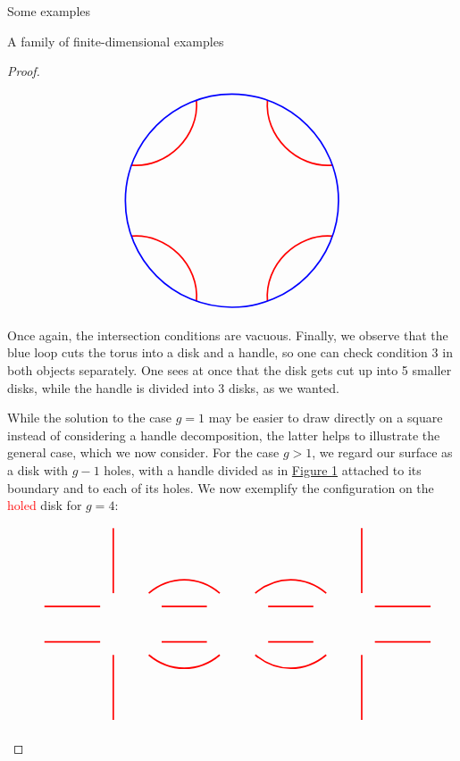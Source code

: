 \begin{chapter}{Some examples}
\begin{section}{A family of finite-dimensional examples}
\begin{proof}
\begin{figure}[h]
\label{divided-handle}
\[
\begin{tikzpicture}

\draw[red, very thick] (-2.83,1) to [bend right=50] (-1,2.83);
\draw[red, very thick] (2.83,1) to [bend left=50] (1,2.83);
\draw[red, very thick] (2.83,-1) to [bend right=50] (1,-2.83);
\draw[red, very thick] (-2.83,-1) to [bend left=50] (-1,-2.83);

\draw[blue, very thick] (0,0) circle (3cm);
\end{tikzpicture}
\]
\end{figure}

Once again, the intersection conditions are vacuous. Finally, we observe that the blue loop cuts the torus into a disk and a handle, so one can check condition $3$ in both objects separately. One sees at once that the disk gets cut up into 5 smaller disks, while the handle is divided into $3$ disks, as we wanted.

While the solution to the case $g=1$ may be easier to draw directly on a square instead of considering a handle decomposition, the latter helps to illustrate the general case, which we now consider. For the case $g>1$, we regard our surface as a disk with $g-1$ holes, with a handle divided as in \hyperref[divided-handle]{Figure \ref*{divided-handle}} attached to its boundary and to each of its holes. We now exemplify the configuration on the \textcolor{red}{holed} disk for $g=4$:

\begin{figure}[h]
\[
\begin{tikzpicture}
\draw[red, very thick] (-5.44, 0.5) -- (-3.87, 0.5);
\draw[red, very thick] (-5.44, -0.5) -- (-3.87, -0.5);
\draw[red, very thick] (5.44, 0.5) -- (3.87, 0.5);
\draw[red, very thick] (5.44, -0.5) -- (3.87, -0.5);

\draw[red, very thick] (-3.5,0.87) -- (-3.5,2.7);
\draw[red, very thick] (-3.5,-0.87) -- (-3.5,-2.7);
\draw[red, very thick] (3.5,0.87) -- (3.5,2.7);
\draw[red, very thick] (3.5,-0.87) -- (3.5,-2.7);

\draw[red, very thick] (-2.137, 0.5) -- (-0.863, 0.5);
\draw[red, very thick] (-2.137, -0.5) -- (-0.863, -0.5);
\draw[red, very thick] (2.137, 0.5) -- (0.863, 0.5);
\draw[red, very thick] (2.137, -0.5) -- (0.863, -0.5);

\draw[red, very thick] (-2.5,0.87) to [bend left=40] (-0.5,0.87);
\draw[red, very thick] (2.5,0.87) to [bend right=40] (0.5,0.87);
\draw[red, very thick] (-2.5,-0.87) to [bend right=40] (-0.5,-0.87);
\draw[red, very thick] (2.5,-0.87) to [bend left=40] (0.5,-0.87);


\end{tikzpicture}\]
\end{figure}
\end{proof}
\end{section}
\end{chapter}
